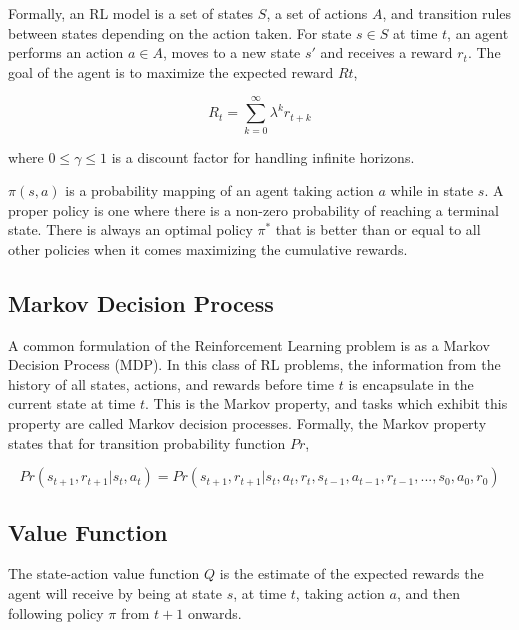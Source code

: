 \documentclass[11pt, oneside]{article}   	%
\begin{document}
\hfill

Formally, an RL model is a set of states $S$, a set of actions $A$, and transition rules between states depending on the action taken. For state $s \in S$ at time $t$, an agent performs an action $a \in A$, moves to a new state $s'$ and receives a reward $r_t$. The goal of the agent is to maximize the expected reward $Rt$,

\begin{equation}
R_t = \sum_{k=0}^{\infty}\lambda^kr_{t+k}
\end{equation}

where $0 \leq \gamma \leq 1$ is a discount factor for handling infinite horizons.

\hfill

$\pi(s,a)$ is a probability mapping of an agent taking action $a$ while in state $s$. A proper policy is one where there is a non-zero probability of reaching a terminal state. There is always an optimal policy $\pi^*$ that is better than or equal to all other policies when it comes maximizing the cumulative rewards. 

\subsection{Markov Decision Process}

A common formulation of the Reinforcement Learning problem is as a Markov Decision Process (MDP). In this class of RL problems, the information from the history of all states, actions, and rewards before time $t$ is encapsulate in the current state at time $t$. This is the Markov property, and tasks which exhibit this property are called Markov decision processes. Formally, the Markov property states that for transition probability function $Pr$,

\begin{equation}
Pr(s_{t+1}, r_{t+1} | s_t, a_t) = Pr(s_{t+1}, r_{t+1} | s_t,a_t, r_t, s_{t-1}, a_{t-1}, r_{t-1},...,s_0, a_0, r_0)
\end{equation}

\subsection{Value Function}
The state-action value function $Q$ is the estimate of the expected rewards the agent will receive by being at state $s$, at time $t$, taking action $a$, and then following policy $\pi$ from $t+1$ onwards. 
\end{document}
